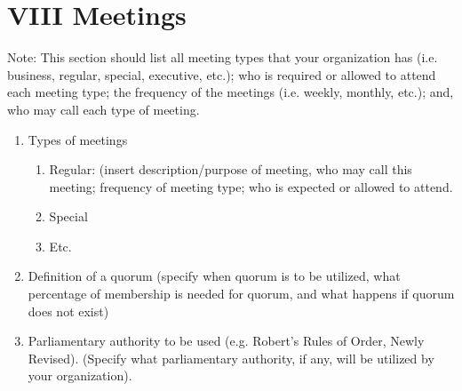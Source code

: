 
\section{VIII \textendash{} Meetings}
Note:  This section should list all meeting types that your organization has
(i.e. business, regular, special, executive, etc.); who is required or allowed
to attend each meeting type; the frequency of the meetings (i.e. weekly,
monthly, etc.); and, who may call each type of meeting. 
\begin{enumerate}
  \item	Types of meetings
    \begin{enumerate}
      \item	Regular:  (insert description/purpose of meeting, who may call this
      meeting; frequency of meeting type; who is expected or allowed to attend.
      \item	Special
      \item	Etc.
    \end{enumerate}
  \item	Definition of a quorum (specify when quorum is to be utilized, what
  percentage of membership is needed for quorum, and what happens if quorum does
  not exist)
  \item	Parliamentary authority to be used (e.g. Robert’s Rules of Order, Newly
  Revised).  (Specify what parliamentary authority, if any, will be utilized by
  your organization).
\end{enumerate}
